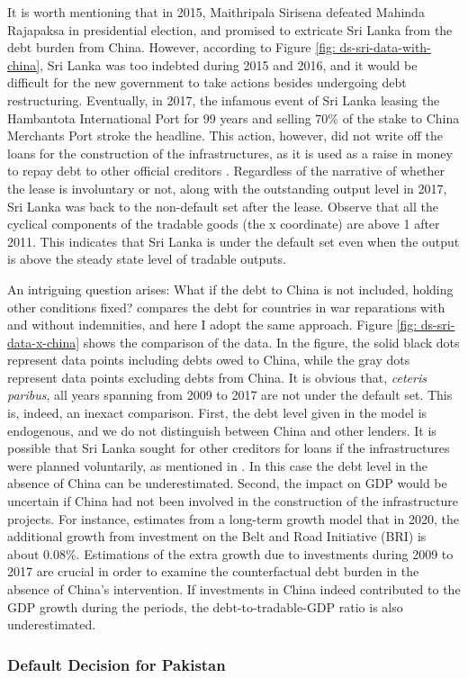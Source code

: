 It is worth mentioning that in 2015, Maithripala Sirisena defeated Mahinda Rajapaksa in presidential election, and promised to extricate Sri Lanka from the debt burden from China. However, according to Figure \ref{fig: ds-sri-data-with-china}, Sri Lanka was too indebted during 2015 and 2016, and it would be difficult for the new government to take actions besides undergoing debt restructuring. Eventually, in 2017, the infamous event of Sri Lanka leasing the Hambantota International Port for 99 years and selling 70\% of the stake to China Merchants Port stroke the headline. This action, however, did not write off the loans for the construction of the infrastructures, as it is used as a raise in money to repay debt to other official creditors \citep{Brautigam-meme-2020, Moramudali_2019}. Regardless of the narrative of whether the lease is involuntary or not, along with the outstanding output level in 2017, Sri Lanka was back to the non-default set after the lease.
Observe that all the cyclical components of the tradable goods (the x coordinate) are above 1 after 2011. This indicates that Sri Lanka is under the default set even when the output is above the steady state level of tradable outputs.

An intriguing question arises: What if the debt to China is not included, holding other conditions fixed? \citet{Hinrichsen_2020-chapter4} compares the debt for countries in war reparations with and without indemnities, and here I adopt the same approach. Figure \ref{fig: ds-sri-data-x-china} shows the comparison of the data. In the figure, the solid black dots represent data points including debts owed to China, while the gray dots represent data points excluding debts from China.
It is obvious that, \emph{ceteris paribus}, all years spanning from 2009 to 2017 are not under the default set. This is, indeed, an inexact comparison.
First, the debt level given in the model is endogenous, and we do not distinguish between China and other lenders. It is possible that Sri Lanka sought for other creditors for loans if the infrastructures were planned voluntarily, as mentioned in \citet{Brautigam-meme-2020}. In this case the debt level in the absence of China can be underestimated.
Second, the impact on GDP would be uncertain if China had not been involved in the construction of the infrastructure projects. For instance, \citet{Bandiera-Vasileios-BRI-debt} estimates from a long-term growth model that in 2020, the additional growth from investment on the Belt and Road Initiative (BRI) is about 0.08\%.
Estimations of the extra growth due to investments during 2009 to 2017 are crucial in order to examine the counterfactual debt burden in the absence of China's intervention. If investments in China indeed contributed to the GDP growth during the periods, the debt-to-tradable-GDP ratio is also underestimated.

\subsubsection*{Default Decision for Pakistan}

